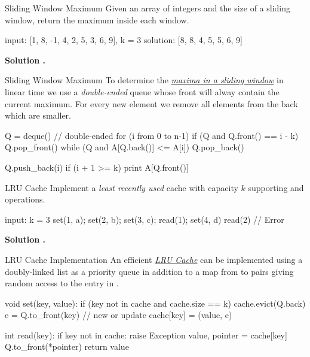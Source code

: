 \documentclass{cognito}
\begin{document}
\begin{note}{Sliding Window Maximum}
	Given an array of integers  and the size  of a sliding window,
	return the maximum inside each window.

	\begin{largecode}
 input: [1, 8, -1, 4, 2, 5, 3, 6, 9], k = 3
 solution: [8, 8, 4, 5, 5, 6, 9]
	\end{largecode}
	\bf Solution \hyperref[note:Sliding Window Maximum Algorithm]{\solutionref}.
\end{note}

\begin{note}{Sliding Window Maximum}
	To determine the \hyperref[note:Sliding Window Maximum]{\it maxima in a sliding window} in linear time we
	use a \emph{double-ended} queue  whose front will alway contain the current maximum.
	For every new element  we remove all elements from the back which are smaller.

	\begin{largecode}
 Q = deque()  // double-ended
 for (i from 0 to n-1)
 	if (Q and Q.front() == i - k) Q.pop_front()
	while (Q and A[Q.back()] <= A[i]) Q.pop_back()
	
	Q.push_back(i)
	if (i + 1 >= k) print A[Q.front()]
	\end{largecode}
	\vspace{-5pt}
\end{note}

\begin{note}{LRU Cache}
	Implement a \emph{least recently used} cache with capacity $k$
	supporting  and  operations.
		\begin{largecode}
 input: k = 3
 set(1, a); set(2, b); set(3, c); read(1); set(4, d)
 read(2)  // Error
	\end{largecode}
	\bf Solution \hyperref[note:LRU Cache Implementation]{\solutionref}.
\end{note}

\begin{note}{LRU Cache Implementation}
	An efficient \hyperref[note:LRU Cache]{\it LRU Cache} can be implemented using
	a doubly-linked list as a priority queue  in addition to a map 
	from  to  pairs giving random access to the entry in .
	\begin{largecode}
 void set(key, value):
 	if (key not in cache and cache.size == k)
		cache.evict(Q.back)
	e = Q.to_front(key) // new or update
	cache[key] = (value, e)
	\end{largecode}
\vspace{-5pt}
	\begin{largecode}
 int read(key):
 	if key not in cache: raise Exception
	value, pointer = cache[key]
	Q.to_front(*pointer)
	return value
	\end{largecode}
	\vspace{-5pt}
\end{note}
\end{document}
